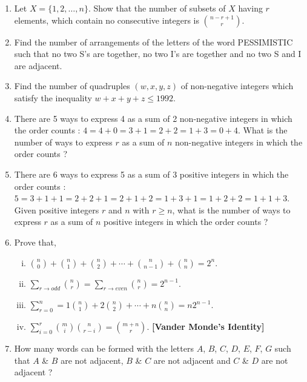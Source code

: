 \documentclass[11pt, a4paper]{article}
\begin{document}
\begin{enumerate}
	\item Let $X = \{1, 2, \ldots, n\}$. Show that the number of subsets of $X$ having $r$ elements, which contain no consecutive integers is $\displaystyle \binom{n-r+1}{r}$.
	
	\item Find the number of arrangements of the letters of the word PESSIMISTIC such that no two S's are together, no two I's are together and no two S and I are adjacent.
	
	\item Find the number of quadruples $(w, x, y, z)$ of non-negative integers which satisfy the inequality $w+x+y+z \leq 1992$.
	
	\item There are 5 ways to express 4 as a sum of 2 non-negative integers in which the order counts : $4 = 4 + 0 = 3 + 1 = 2 + 2 = 1 + 3 = 0 + 4$. What is the number of ways to express $r$ as a sum of $n$ non-negative integers in which the order counts ?
	
	\item There are 6 ways to express 5 as a sum of 3 positive integers in which the order counts : \\ $5 = 3 + 1 + 1 = 2 + 2 + 1 = 2+1+2 = 1+3+1=1+2+2=1+1+3$. Given positive integers $r$ and $n$ with $r \geq n$, what is the number of ways to express $r$ as a sum of $n$ positive integers in which the order counts ?
	
	\item Prove that, 
	\begin{enumerate}[(i)]
		\item $\displaystyle \binom{n}{0} + \binom{n}{1} + \binom{n}{2} + \cdots + \binom{n}{n-1} + \binom{n}{n} = 2^n $.
		\item $\displaystyle \sum \limits_{r \rightarrow odd} \binom{n}{r} = \sum \limits_{r \rightarrow even} \binom{n}{r} = 2^{n-1}$.
		\item $\displaystyle \sum \limits_{r = 0}^{n} = 1\binom{n}{1} + 2\binom{n}{2} + \cdots + n\binom{n}{n} = n 2^{n-1}$.
		\item $\displaystyle \sum \limits_{i = 0}^{r} \binom{m}{i} \binom{n}{r-i} = \binom{m+n}{r}$. \textbf{[Vander Monde's Identity]}
	
	\end{enumerate}
	
	\item How many words can be formed with the letters $A$, $B$, $C$, $D$, $E$, $F$, $G$ such that $A$ \& $B$ are not adjacent, $B$ \& $C$ are not adjacent and $C$ \& $D$ are not adjacent ? 
	

\end{enumerate}
\end{document}
